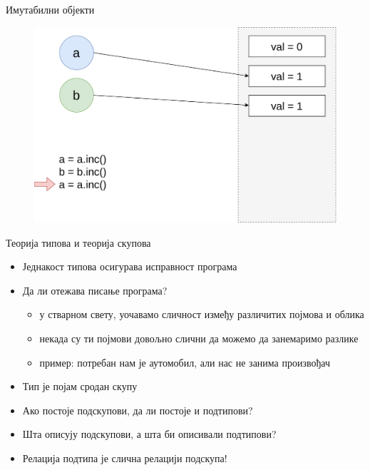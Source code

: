 \documentclass[xcolor=table]{beamer}
\begin{document}
    \begin{frame}{Имутабилни објекти}
        \begin{figure}
            \centering
            \includegraphics[height=0.7\textheight,keepaspectratio]{images/imut2.png}
        \end{figure}
    \end{frame}

    \begin{frame}{Теорија типова и теорија скупова}
        \begin{itemize}
            \item Једнакост типова осигурава исправност програма
            \item Да ли отежава писање програма?
            \begin{itemize}
                \item у стварном свету, уочавамо сличност између различитих појмова и облика
                \item некада су ти појмови довољно слични да можемо да занемаримо разлике
                \item пример: потребан нам је аутомобил, али нас не занима произвођач
            \end{itemize}
            \item Тип је појам сродан скупу
            \item Ако постоје подскупови, да ли постоје и подтипови?
            \item Шта описују подскупови, а шта би описивали подтипови?
            \item Релација подтипа је слична релацији подскупа!
        \end{itemize}
    \end{frame}
    
\end{document}
